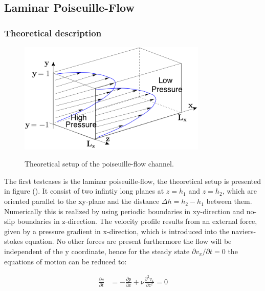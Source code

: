 \subsection{Laminar Poiseuille-Flow}
\subsubsection{Theoretical description}

\begin{figure}[!bp]
  \centering
  \includegraphics[width=0.8\textwidth]{gfx/immersed_boundary/val_volpen/poiseuilleflow.png}\label{b}
  \caption{Theoretical setup of the poiseuille-flow channel.}
\end{figure}



The first testcases is the laminar poiseuille-flow, the theoretical setup is presented in figure ().
It consist of two infintiy long planes at $z=h_1$ and $z=h_2$, which are oriented parallel to the xy-plane and the distance $\Delta h = h_2 - h_1$ between them.
Numerically this is realized by using periodic boundaries in xy-direction and no-slip boundaries in z-direction.
The velocity profile results from an external force, given by a  pressure gradient in x-direction, which is introduced into the naviers-stokes equation.
No other forces are present furthermore the flow will be independent of the y coordinate,
hence for the steady state $\partial v_x /\partial t = 0$ the equations of motion can be reduced to:

\begin{align}
\frac{\partial v}{\partial t} &= - \frac{\partial p}{\partial x} + \nu \frac{\partial^2 v_x}{\partial z^2} = 0
\end{align}


